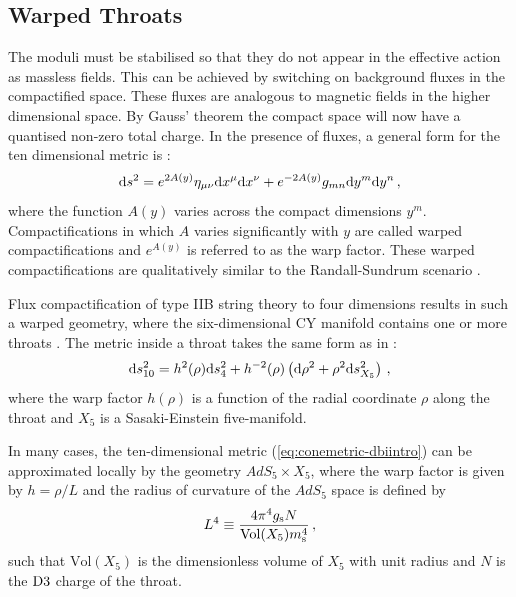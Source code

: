 \subsection{Warped Throats}
\label{sec:warpedthroats-dbiintro}
The moduli must
be stabilised so that they do not appear in the effective action as
massless fields. This can be achieved by switching on background fluxes in the
compactified space. These fluxes are analogous to magnetic
fields in the higher dimensional space. By Gauss' theorem  the compact space
will now have a quantised non-zero total charge.
In the presence of fluxes, a general form for the ten dimensional metric is
\cite{Baumann:2009ni}:
\begin{equation}
\label{eq:warpedmetric-dbiintro}
 \mathrm{d} s^2 = e^{2A(y)}\eta_{\mu\nu} \mathrm{d} x^\mu \mathrm{d} x^\nu + e^{-2A(y)} g_{mn}\mathrm{d} y^m
\mathrm{d} y^n\,,
\end{equation}
where the function $A(y)$ varies across the compact dimensions $y^m$.
Compactifications in which $A$ varies significantly with $y$ are called warped
compactifications and $e^{A(y)}$ is referred to as the warp factor. These warped
compactifications are qualitatively similar to
the Randall-Sundrum scenario \cite{Randall1999,Brummer2006}.


Flux compactification of type IIB string theory to four dimensions 
results in such a warped geometry, where the six-dimensional CY  
manifold contains one or more throats \cite{douglas,gkp,grana}. 
The metric inside a throat takes the same form as in
:
% 
\begin{equation}
\label{eq:conemetric-dbiintro}
\mathrm{d} s_{10}^2= h^2 ( \rho) \mathrm{d} s_4^2 + h^{-2} (\rho ) 
\left( \mathrm{d}\rho^2 +\rho^2 \mathrm{d} s_{X_5}^2 \right) \,,
\end{equation}
%  
where the warp factor $h (\rho)$ is a function of the 
radial coordinate $\rho$ along the throat and $X_5$
is a Sasaki-Einstein five-manifold. 


In many cases, the ten-dimensional metric (\ref{eq:conemetric-dbiintro}) can be 
approximated locally by the geometry $AdS_5 \times X_5$, where the 
warp factor is given by $h=\rho /L$ and 
the radius of curvature of the $AdS_5$ space is defined by
%  
\begin{equation}
L^4 \equiv \frac{4\pi^4 g_\mathrm{s} N}{{\rm Vol} (X_5) m_\mathrm{s}^4} \,,
\end{equation}
% 
such that $\mathrm{Vol}(X_5)$ is the dimensionless volume of 
$X_5$ with unit radius and $N$ is the ${\rm D3}$  charge of the throat.


